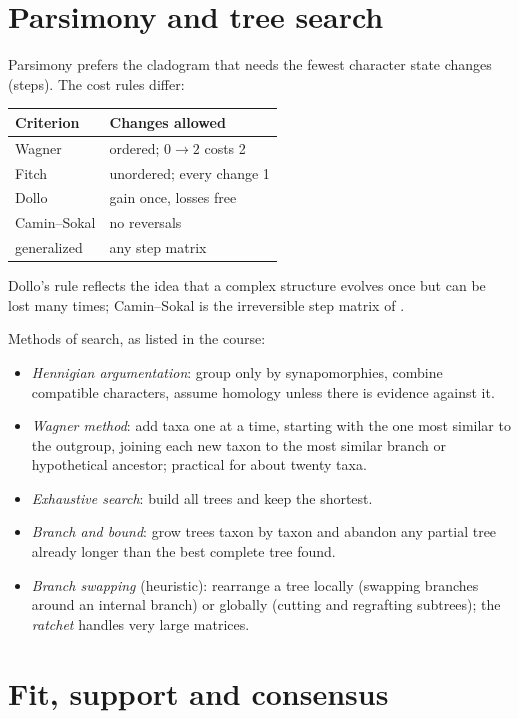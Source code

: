 \section{Parsimony and tree search}
\label{section-parsimony}

Parsimony prefers the cladogram that
needs the fewest character state changes
(steps). The cost rules differ:
\begin{center}
\begin{tabular}{ll}
Criterion & Changes allowed \\
\hline
Wagner & ordered; $0 \rightarrow 2$
costs 2 \\
Fitch & unordered; every change 1 \\
Dollo & gain once, losses free \\
Camin--Sokal & no reversals \\
generalized & any step matrix
\end{tabular}
\end{center}
Dollo's rule reflects the idea that a
complex structure evolves once but can be
lost many times; Camin--Sokal is the
irreversible step matrix of
\cite[Chapter 2]{simpson2006plant}.

Methods of search, as listed in the
course:
\begin{itemize}
\item \emph{Hennigian argumentation}:
group only by synapomorphies, combine
compatible characters, assume homology
unless there is evidence against it.
\item \emph{Wagner method}: add taxa one
at a time, starting with the one most
similar to the outgroup, joining each new
taxon to the most similar branch or
hypothetical ancestor; practical for about
twenty taxa.
\item \emph{Exhaustive search}: build all
trees and keep the shortest.
\item \emph{Branch and bound}: grow trees
taxon by taxon and abandon any partial
tree already longer than the best complete
tree found.
\item \emph{Branch swapping} (heuristic):
rearrange a tree locally (swapping
branches around an internal branch) or
globally (cutting and regrafting
subtrees); the \emph{ratchet} handles very
large matrices.
\end{itemize}

\section{Fit, support and consensus}
\label{section-support}

